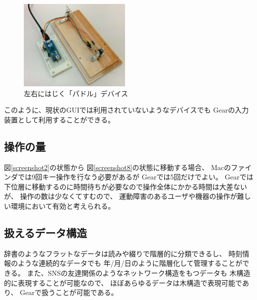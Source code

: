 \documentclass[twoside]{wiss}
\def\GEAR{\textsf{Gear}}
\begin{document}
\begin{figure}[H]
  \centerline{\includegraphics[width=54mm,bb=0 0 514 418]{figures/3c2de63899653056f3c6be835b9aaf43.png}}
\caption{左右にはじく「パドル」デバイス}
\label{paddle}
\end{figure}

\noindent
このように、現状のGUIでは利用されていないようなデバイスでも
{\GEAR}の入力装置として利用することができる。

\subsection{操作の量}

図\ref{screenshot2}の状態から
図\ref{screenshot8}の状態に移動する場合、
Macのファインダでは9回キー操作を行なう必要があるが
{\GEAR}では5回だけでよい。
{\GEAR}では下位層に移動するのに時間待ちが必要なので操作全体にかかる時間は大差ないが、
操作の数は少なくてすむので、
運動障害のあるユーザや機器の操作が難しい環境において有効と考えられる。

\subsection{扱えるデータ構造}

辞書のようなフラットなデータは読みや綴りで階層的に分類できるし、
時刻情報のような連続的なデータでも
年/月/日のように階層化して管理することができる。
また、SNSの友達関係のようなネットワーク構造をもつデータも
木構造的に表現することが可能なので、
ほぼあらゆるデータは木構造で表現可能であり、
{\GEAR}で扱うことが可能である。

% 
% 
% 
\end{document}
